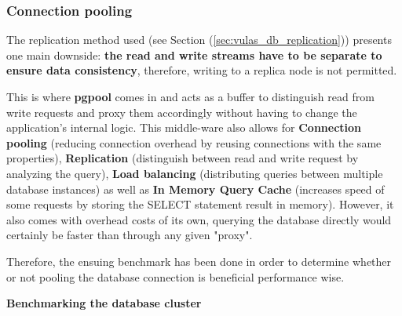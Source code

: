 \documentclass[11pt]{article}
\begin{document}
\vspace{5mm}
\subsubsection{Connection pooling}

\hspace{5mm} The replication method used (see Section (\ref{sec:vulas_db_replication})) presents one main downside: \textbf{the read and write streams have to be separate to ensure data consistency}, therefore, writing to a replica node is not permitted. 

This is where \textbf{pgpool} comes in and acts as a buffer to distinguish read from write requests and proxy them accordingly without having to change the application's internal logic. This middle-ware also allows for \textbf{Connection pooling} (reducing connection overhead by reusing connections with the same properties), \textbf{Replication} (distinguish between read and write request by analyzing the query), \textbf{Load balancing} (distributing queries between multiple database instances) as well as \textbf{In Memory Query Cache} (increases speed of some requests by storing the SELECT statement result in memory). However, it also comes with overhead costs of its own, querying the database directly would certainly be faster than through any given "proxy".

Therefore, the ensuing benchmark has been done in order to determine whether or not pooling the database connection is beneficial performance wise. 

\vspace{3mm}
\textbf{Benchmarking the database cluster} \label{sec:connection_pool_bench}
\end{document}
